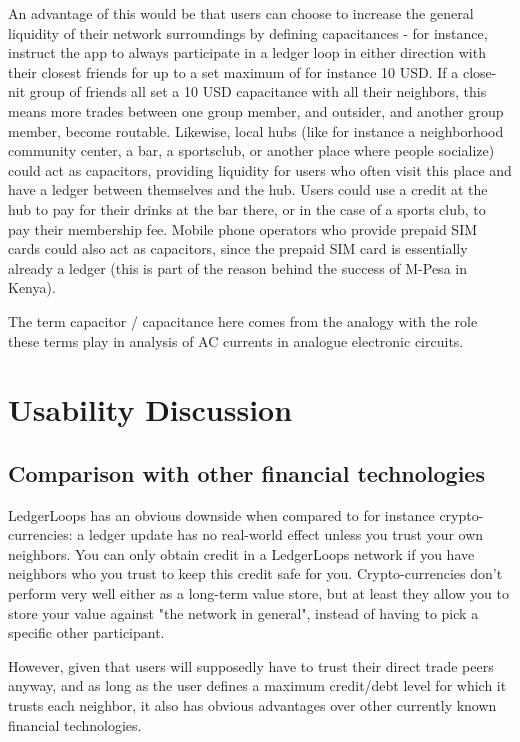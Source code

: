 \documentclass[11pt,twoside,a4paper]{article}
\begin{document}
An advantage of this would be that users can choose to increase the general liquidity of their network surroundings by defining capacitances - for instance, instruct the app to always participate in a ledger loop in either direction with their closest friends for up to a set maximum of for instance 10 USD. If a close-nit group of friends all set a 10 USD capacitance with all their neighbors, this means more trades between one group member, and outsider, and another group member, become routable. Likewise, local hubs (like for instance a neighborhood community center, a bar, a sportsclub, or another place where people socialize) could act as capacitors, providing liquidity for users who often visit this place and have a ledger between themselves and the hub. Users could use a credit at the hub to pay for their drinks at the bar there, or in the case of a sports club, to pay their membership fee. Mobile phone operators who provide prepaid SIM cards could also act as capacitors, since the prepaid SIM card is essentially already a ledger (this is part of the reason behind the success of M-Pesa in Kenya).

The term capacitor / capacitance here comes from the analogy with the role these terms play in analysis of AC currents in analogue electronic circuits.

\section{Usability Discussion}
\subsection{Comparison with other financial technologies}
LedgerLoops has an obvious downside when compared to for instance crypto-currencies: a ledger update has no real-world effect unless you trust your own neighbors. You can only obtain credit in a LedgerLoops network if you have neighbors who you trust to keep this credit safe for you. Crypto-currencies don't perform very well either as a long-term value store, but at least they allow you to store your value against "the network in general", instead of having to pick a specific other participant.

However, given that users will supposedly have to trust their direct trade peers anyway, and as long as the user defines a maximum credit/debt level for which it trusts each neighbor, it also has obvious advantages over other currently known financial technologies.
\end{document}
